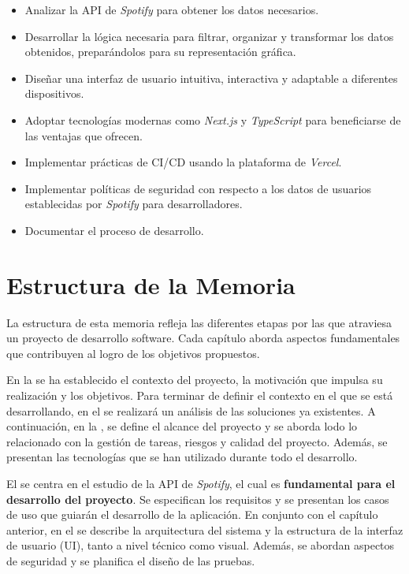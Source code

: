 \begin{itemize}
    \item Analizar la API de \textit{Spotify} para obtener los datos necesarios.
    \item Desarrollar la lógica necesaria para filtrar, organizar y transformar los datos obtenidos, preparándolos para su representación gráfica.
    \item Diseñar una interfaz de usuario intuitiva, interactiva y adaptable a diferentes dispositivos.
    \item Adoptar tecnologías modernas como \textit{Next.js} y \textit{TypeScript} para beneficiarse de las ventajas que ofrecen.
    \item Implementar prácticas de CI/CD usando la plataforma de \textit{Vercel}.
    \item Implementar políticas de seguridad con respecto a los datos de usuarios establecidas por \textit{Spotify} para desarrolladores.
    \item Documentar el proceso de desarrollo.
\end{itemize}

\section{Estructura de la Memoria}

La estructura de esta memoria refleja las diferentes etapas por las que atraviesa un proyecto de desarrollo software. Cada capítulo aborda aspectos fundamentales que contribuyen al logro de los objetivos propuestos.

En la  se ha establecido el contexto del proyecto, la motivación que impulsa su realización y los objetivos. Para terminar de definir el contexto en el que se está desarrollando, en el  se realizará un análisis de las soluciones ya existentes. A continuación, en la , se define el alcance del proyecto y se aborda lodo lo relacionado con la gestión de tareas, riesgos y calidad del proyecto. Además, se presentan las tecnologías que se han utilizado durante todo el desarrollo.

El  se centra en el estudio de la API de \textit{Spotify}, el cual es \textbf{fundamental para el desarrollo del proyecto}. Se especifican los requisitos y se presentan los casos de uso que guiarán el desarrollo de la aplicación. En conjunto con el capítulo anterior, en el  se describe la arquitectura del sistema y la estructura de la interfaz de usuario (UI), tanto a nivel técnico como visual. Además, se abordan aspectos de seguridad y se planifica el diseño de las pruebas.

